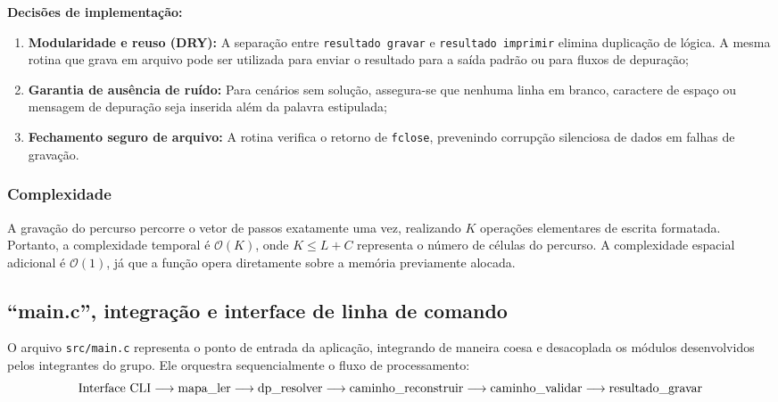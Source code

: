 \documentclass[12pt,a4paper]{article}
\makeatletter
\DeclareRobustCommand{\_}{%
  \ifmmode
    \nfss@text{\textunderscore}%
  \else
    \textunderscore\allowbreak
  \fi
}
\makeatother
\begin{document}
\textbf{Decisões de implementação:}
\begin{enumerate}
    \item \textbf{Modularidade e reuso (DRY):} A separação entre \texttt{resultado\_gravar} e \texttt{resultado\_imprimir} elimina duplicação de lógica. A mesma rotina que grava em arquivo pode ser utilizada para enviar o resultado para a saída padrão ou para fluxos de depuração;
    \item \textbf{Garantia de ausência de ruído:} Para cenários sem solução, assegura-se que nenhuma linha em branco, caractere de espaço ou mensagem de depuração seja inserida além da palavra estipulada;
    \item \textbf{Fechamento seguro de arquivo:} A rotina verifica o retorno de \texttt{fclose}, prevenindo corrupção silenciosa de dados em falhas de gravação.
\end{enumerate}

\subsubsection*{Complexidade}

A gravação do percurso percorre o vetor de passos exatamente uma vez, realizando $K$ operações elementares de escrita formatada. Portanto, a complexidade temporal é $\mathcal{O}(K)$, onde $K \le L + C$ representa o número de células do percurso. A complexidade espacial adicional é $\mathcal{O}(1)$, já que a função opera diretamente sobre a memória previamente alocada.


\subsection{``main.c'', integração e interface de linha de comando}

O arquivo \texttt{src/main.c} representa o ponto de entrada da aplicação, integrando de maneira coesa e desacoplada os módulos desenvolvidos pelos integrantes do grupo. Ele orquestra sequencialmente o fluxo de processamento:
\begin{equation}
\text{Interface CLI} \longrightarrow \text{mapa\_ler} \longrightarrow \text{dp\_resolver} \longrightarrow \text{caminho\_reconstruir} \longrightarrow \text{caminho\_validar} \longrightarrow \text{resultado\_gravar}
\end{equation}
\end{document}
